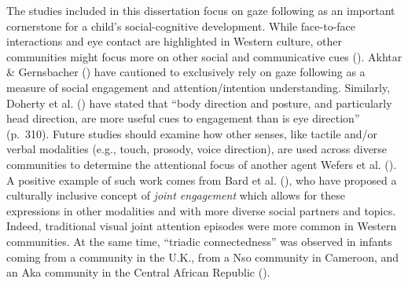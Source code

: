 \documentclass[
]{scrbook}
\begin{document}
The studies included in this dissertation focus on gaze following as an important cornerstone for a child's social-cognitive development. While face-to-face interactions and eye contact are highlighted in Western culture, other communities might focus more on other social and communicative cues (). Akhtar \& Gernsbacher () have cautioned to exclusively rely on gaze following as a measure of social engagement and attention/intention understanding. Similarly, Doherty et al. () have stated that ``body direction and posture, and particularly head direction, are more useful cues to engagement than is eye direction'' (p.~310). Future studies should examine how other senses, like tactile and/or verbal modalities (e.g., touch, prosody, voice direction), are used across diverse communities to determine the attentional focus of another agent Wefers et al. (). A positive example of such work comes from Bard et al. (), who have proposed a culturally inclusive concept of \emph{joint engagement} which allows for these expressions in other modalities and with more diverse social partners and topics. Indeed, traditional visual joint attention episodes were more common in Western communities. At the same time, ``triadic connectedness'' was observed in infants coming from a community in the U.K., from a Nso community in Cameroon, and an Aka community in the Central African Republic ().
\end{document}
